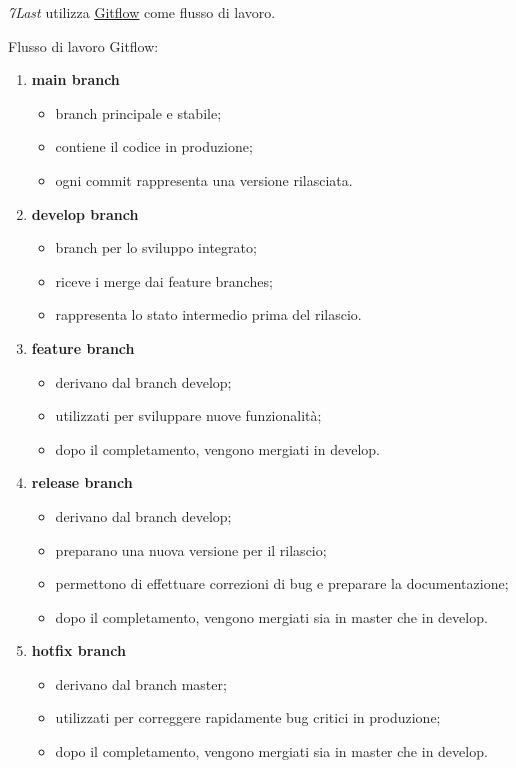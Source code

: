 \textit{7Last} utilizza \href{https://www.atlassian.com/it/git/tutorials/comparing-workflows/gitflow-workflow}{\underline{{Gitflow}}} come flusso di lavoro.
\begin{flushleft}
	Flusso di lavoro Gitflow:
\end{flushleft}
\begin{enumerate}
    \item \textbf{main branch}
    \begin{itemize}
        \item branch principale e stabile;
        \item contiene il codice in produzione;
        \item ogni commit rappresenta una versione rilasciata.
    \end{itemize}

    \item \textbf{develop branch}
    \begin{itemize}
        \item branch per lo sviluppo integrato;
        \item riceve i merge dai feature branches;
        \item rappresenta lo stato intermedio prima del rilascio.
    \end{itemize}

    \item \textbf{feature branch}
    \begin{itemize}
        \item derivano dal branch develop;
        \item utilizzati per sviluppare nuove funzionalità;
        \item dopo il completamento, vengono mergiati in develop.
    \end{itemize}

    \item \textbf{release branch}
    \begin{itemize}
        \item derivano dal branch develop;
        \item preparano una nuova versione per il rilascio;
        \item permettono di effettuare correzioni di bug e preparare la documentazione;
        \item dopo il completamento, vengono mergiati sia in master che in develop.
    \end{itemize}

    \item \textbf{hotfix branch}
    \begin{itemize}
        \item derivano dal branch master;
        \item utilizzati per correggere rapidamente bug critici in produzione;
        \item dopo il completamento, vengono mergiati sia in master che in develop.
    \end{itemize}
\end{enumerate}

